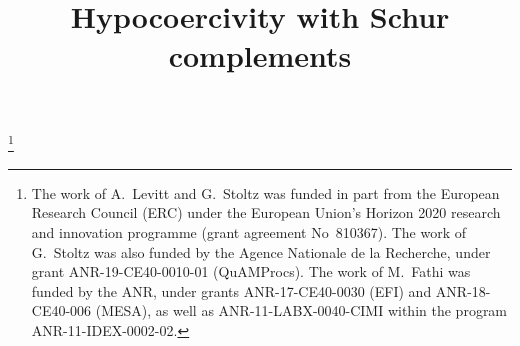 \newcommand{\cLNH}{\cL_{\rm NH}}
\graphicspath{{./figures/}}

\newcommand*{\mk}{\mkern -1mu}
\newcommand*{\Mk}{\mkern -2mu}
\newcommand*{\mK}{\mkern 1mu}
\newcommand*{\MK}{\mkern 2mu}


\newcommand*{\romanenumi}{\renewcommand*{\theenumi}{\roman{enumi}}}
\newcommand*{\Romanenumi}{\renewcommand*{\theenumi}{\Roman{enumi}}}
\newcommand*{\alphenumi}{\renewcommand*{\theenumi}{\alph{enumi}}}
\newcommand*{\Alphenumi}{\renewcommand*{\theenumi}{\Alph{enumi}}}
\let\oldtilde\tilde
\renewcommand*{\tilde}[1]{\mathchoice{\widetilde{#1}}{\widetilde{#1}}{\oldtilde{#1}}{\oldtilde{#1}}}
\let\oldforall\forall
\renewcommand*{\forall}{\mathrel{\oldforall}}

\title[Hypocoercivity with Schur complements]{Hypocoercivity with Schur complements}



\author[\initial{E.} \lastname{Bernard}]{ }
\address{CERMICS, \\
\'Ecole des Ponts,\\
Marne-la-Vallée (France)}

\thanks{The work of A.~Levitt and G.~Stoltz was funded in part from the European Research Council (ERC) under the European Union's Horizon 2020 research and innovation programme (grant agreement No~810367). The work of G.~Stoltz was also funded by the Agence Nationale de la Recherche, under grant ANR-19-CE40-0010-01 (QuAMProcs). The work of M.~Fathi was funded by the ANR, under grants ANR-17-CE40-0030 (EFI) and ANR-18-CE40-006 (MESA), as well as ANR-11-LABX-0040-CIMI within the program ANR-11-IDEX-0002-02.}


\author[\initial{M.} \lastname{Fathi}]{ }
\address{Université Paris Cité\\
and Sorbonne Université, CNRS,\\
Laboratoire Jacques-Louis Lions\\
and Laboratoire de Probabilités,\\
Statistique et Modélisation,\\
F-75013 Paris  (France)}

